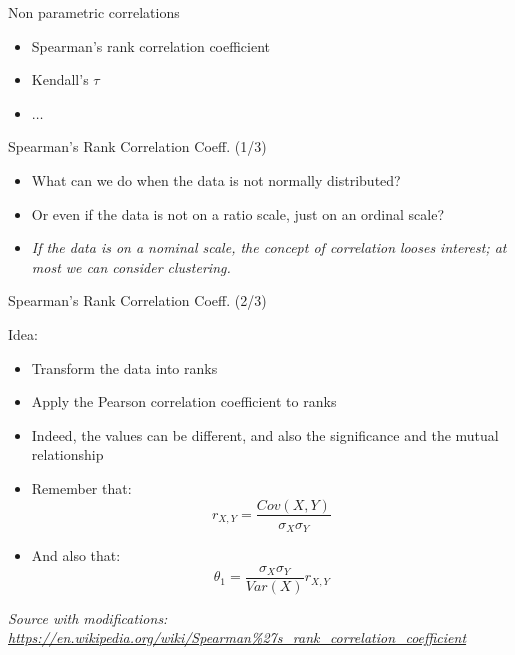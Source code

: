 \documentclass{beamer}
\begin{document}
\begin{frame}
{\centerline{Non parametric correlations}}

\begin{itemize}
    \item Spearman's rank correlation coefficient
    \item Kendall's $\tau$
    \item $\ldots{}$

\end{itemize}

\end{frame}


\begin{frame}
{\centerline{Spearman's Rank Correlation Coeff. (1/3)}}

\begin{itemize}
   \item What can we do when the data is not normally distributed?
   \item Or even if the data is not on a ratio scale, just on an ordinal scale?\newline
   \item \textit{If the data is on a nominal scale, the concept of correlation looses interest; at most we can consider clustering.}
\end{itemize}


\end{frame}

\begin{frame}
{\centerline{Spearman's Rank Correlation Coeff. (2/3)}}
Idea:
\begin{itemize}
   \item Transform the data into ranks
   \item Apply the Pearson correlation coefficient to ranks
   \item Indeed, the values can be different, and also the significance and the mutual relationship
   \item Remember that:
   $$r_{X,Y} = \frac{Cov(X,Y)}{\sigma_X\sigma_Y}$$
   \item And also that:
   $$ \theta_1  = \frac{\sigma_X\sigma_Y}{Var(X)} r_{X,Y}   $$
\end{itemize}

\textit{\tiny
\vspace{-\baselineskip}
Source with modifications: \url{https://en.wikipedia.org/wiki/Spearman\%27s_rank_correlation_coefficient}}

\end{frame}
\end{document}
